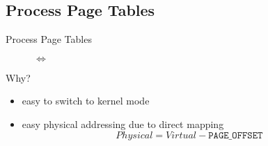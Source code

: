 \subsection{Process Page Tables}
\label{sec:process-page-tables}

\begin{frame}{Process Page Tables}
  \begin{description}
  \item[] $\Leftrightarrow$ 
  \end{description}

  \begin{block}{}
    \begin{center}
    \end{center}
  \end{block}
  \begin{center}
  \end{center}
  \begin{block}{Why?}
    \begin{itemize}
    \item easy to switch to kernel mode
    \item easy physical addressing due to direct mapping
      $$Physical = Virtual - \mathtt{PAGE\_OFFSET}$$
    \end{itemize}
  \end{block}
\end{frame}


